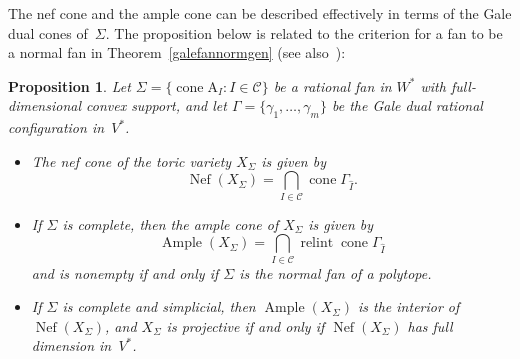 \documentclass[a4paper]{amsart}
\newtheorem{proposition}[theorem]{Proposition}
\theoremstyle{definition}
\theoremstyle{remark}
\numberwithin{equation}{section}
\def\cone{\mathop{\mathrm{cone}}}
\def\relint{\mathop{\mathrm{relint}}}
\newcommand{\<}{\langle}
\renewcommand{\>}{\rangle}
\begin{document}
The nef cone and the ample cone can be described effectively in terms of the Gale dual cones of~$\Sigma$. The proposition below is related to the criterion for a fan to be a normal fan in Theorem~\ref{galefannormgen} (see also~\cite[Proposition~2.4.2.6]{a-d-h-l15}):

\begin{proposition}\label{nefcone}
Let $\Sigma=\{\cone\mathrm A_I\colon I\in\mathcal C\}$ be a rational fan in $W^*$ with full-dimensional convex support, and let $\Gamma=\{\gamma_1,\ldots,\gamma_m\}$ be the Gale dual rational configuration in~$V^*$. 
\begin{itemize}
\item[(1)] The nef cone of the toric variety $X_\Sigma$ is given by
\[
  \mathop\mathrm{Nef}(X_\Sigma)=\bigcap_{I\in\mathcal C}\cone\Gamma_{\widehat I}.
\]

\item[(2)] If $\Sigma$ is complete, then the ample cone of $X_\Sigma$ is given by
\[
  \mathop\mathrm{Ample}(X_\Sigma)=\bigcap_{I\in\mathcal C}
  \relint\cone\Gamma_{\widehat I}
\]
and is nonempty if and only if $\Sigma$ is the normal fan of a polytope.

\smallskip

\item[(3)] If $\Sigma$ is complete and simplicial, then $\mathop\mathrm{Ample}(X_\Sigma)$ is the interior of~$\mathop\mathrm{Nef}(X_\Sigma)$, and $X_\Sigma$ is projective if and only if $\mathop\mathrm{Nef}(X_\Sigma)$ has full dimension in~$V^*$.
\end{itemize}
\end{proposition}
\end{document}
